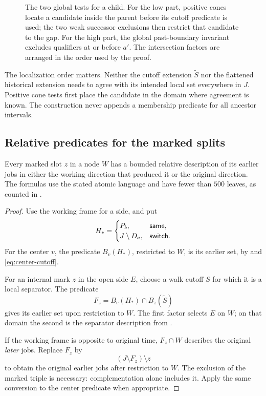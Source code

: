 \begin{figure}[t]
\centering

\caption{The two global tests for a child.
For the low part, positive cones locate a candidate inside the parent
before its cutoff predicate is used; the two weak successor exclusions
then restrict that candidate to the gap.
For the high part, the global past-boundary invariant excludes
qualifiers at or before \(a'\).
The intersection factors are arranged in the order used by the proof.}
\label{fig:gap}
\end{figure}

The localization order matters. Neither the cutoff extension
\(\widetilde S\) nor the flattened historical extension needs to
agree with its intended local set everywhere in \(J\).
Positive cone tests first place the candidate in the domain where
agreement is known. The construction never appends a membership
predicate for all ancestor intervals.

\subsection{Relative predicates for the marked splits}

\begin{lemma}\label{lem:relative-splits}
Every marked slot \(z\) in a node \(W\) has a bounded relative
description of its earlier jobs in either the working direction
that produced it or the original direction. The formulas use the stated
atomic language and have fewer than \(500\) leaves, as counted in
.
\end{lemma}
\begin{proof}
Use the working frame for a side, and put
\[
 H_*=
 \begin{cases}
 P_b,&\mathsf{same},\\
 J\setminus D_a,&\mathsf{switch}.
 \end{cases}
\]
For the center \(v\), the predicate \(B_v(H_*)\), restricted to
\(W\), is its earlier set, by
 and \eqref{eq:center-cutoff}.

For an internal mark \(z\) in the open side \(E\), choose a walk
cutoff \(S\) for which it is a local separator.
The predicate
\begin{equation}
 F_z=B_v(H_*)\cap B_z(\widetilde S)
 \label{eq:relative-split}
\end{equation}
gives its earlier set upon restriction to \(W\).
The first factor selects \(E\) on \(W\); on that domain the
second is the separator description from
.

If the working frame is opposite to original time, \(F_z\cap W\)
describes the original \emph{later} jobs. Replace \(F_z\) by
\begin{equation}
 (J\setminus F_z)\setminus z
 \label{eq:reverse-split}
\end{equation}
to obtain the original earlier jobs after restriction to \(W\).
The exclusion of the marked triple is necessary: complementation
alone includes it. Apply the same conversion to the center
predicate when appropriate.
\end{proof}

